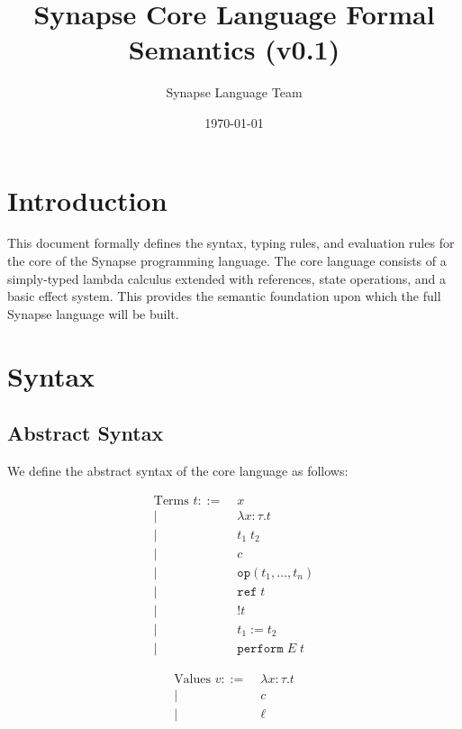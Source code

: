\documentclass{article}
\title{Synapse Core Language Formal Semantics (v0.1)}
\author{Synapse Language Team}
\date{\today}
\begin{document}
\maketitle

\section{Introduction}

This document formally defines the syntax, typing rules, and evaluation rules for the core of the Synapse programming language. The core language consists of a simply-typed lambda calculus extended with references, state operations, and a basic effect system. This provides the semantic foundation upon which the full Synapse language will be built.

\section{Syntax}

\subsection{Abstract Syntax}

We define the abstract syntax of the core language as follows:

\begin{align}
\text{Terms } t ::= &\; x \tag{variables} \\
                 | &\; \lambda x:\tau. t \tag{abstraction} \\
                 | &\; t_1 \; t_2 \tag{application} \\
                 | &\; c \tag{constants} \\
                 | &\; \texttt{op}(t_1, \ldots, t_n) \tag{primitive operations} \\
                 | &\; \texttt{ref} \; t \tag{reference creation} \\
                 | &\; ! t \tag{dereference} \\
                 | &\; t_1 := t_2 \tag{assignment} \\
                 | &\; \texttt{perform} \; E \; t \tag{effect performance}
\end{align}

\begin{align}
\text{Values } v ::= &\; \lambda x:\tau. t \tag{closures} \\
                   | &\; c \tag{constants} \\
                   | &\; \ell \tag{memory locations}
\end{align}
\end{document}
